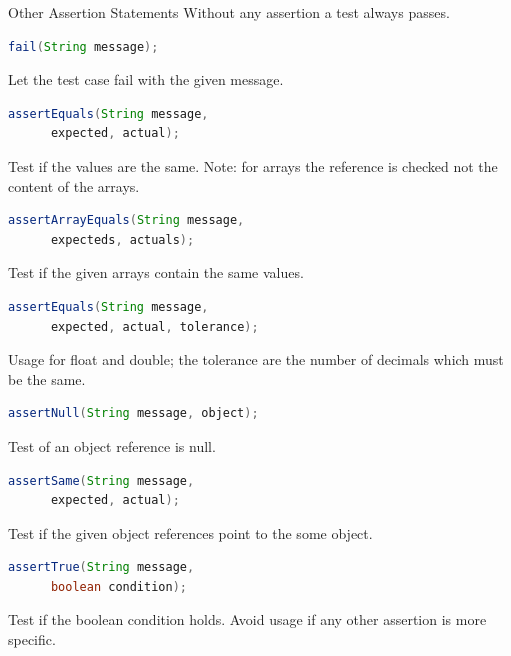 \begin{Frame}{Other Assertion Statements}
  Without any assertion a test always passes.

  \xxx

  \begin{lstlisting}[language=Java,gobble=4]
    fail(String message);
  \end{lstlisting}
  Let the test case fail with the given message.

  \xxx

  \begin{lstlisting}[language=Java,gobble=4]
    assertEquals(String message,
      expected, actual);
  \end{lstlisting}

  Test if the values are the same. Note: for arrays the reference is checked not the content of the arrays.

  \xxx

  \begin{lstlisting}[language=Java,gobble=4]
    assertArrayEquals(String message,
      expecteds, actuals);
  \end{lstlisting}

  Test if the given arrays contain the same values.

  \framebreak

  \begin{lstlisting}[language=Java,gobble=4]
    assertEquals(String message,
      expected, actual, tolerance);
  \end{lstlisting}

  Usage for float and double; the tolerance are the number of decimals which must be the same.

  \xxx

  \begin{lstlisting}[language=Java,gobble=4]
    assertNull(String message, object);
  \end{lstlisting}

  Test of an object reference is null.

  \xxx

  \begin{lstlisting}[language=Java,gobble=4]
    assertSame(String message,
      expected, actual);
  \end{lstlisting}

  Test if the given object references point to the some object.

  \framebreak

  \begin{lstlisting}[language=Java,gobble=4]
    assertTrue(String message,
      boolean condition);
  \end{lstlisting}

  Test if the boolean condition holds. Avoid usage if any other assertion is more specific.
\end{Frame}

